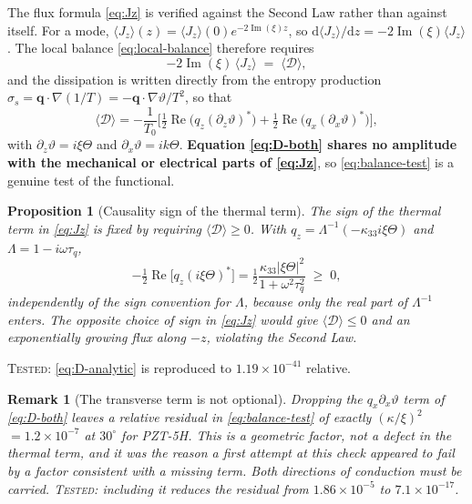 \documentclass[11pt]{article}
\newcommand{\bth}{\vartheta}
\newcommand{\bq}{\bm{q}}
\newcommand{\Lam}{\Lambda}
\theoremstyle{plain}
\newtheorem{proposition}{Proposition}
\newtheorem{remark}{Remark}
\begin{document}
The flux formula \eqref{eq:Jz} is verified against the Second Law rather than
against itself. For a mode,
$\langle J_z\rangle(z)=\langle J_z\rangle(0)e^{-2\operatorname{Im}(\xi)z}$, so
$\mathrm{d}\langle J_z\rangle/\mathrm{d}z=-2\operatorname{Im}(\xi)\langle J_z\rangle$.
The local balance \eqref{eq:local-balance} therefore requires
\begin{equation}
  -2\operatorname{Im}(\xi)\,\langle J_z\rangle
  \;=\;\langle\mathcal{D}\rangle ,
  \label{eq:balance-test}
\end{equation}
and the dissipation is written directly from the entropy production
$\sigma_s=\bq\cdot\nabla(1/T)=-\bq\cdot\nabla\bth/T^2$, so that
\begin{equation}
  \langle\mathcal{D}\rangle
  = -\frac{1}{T_0}\Big[\tfrac12\operatorname{Re}\big(q_z(\partial_z\bth)^*\big)
    +\tfrac12\operatorname{Re}\big(q_x(\partial_x\bth)^*\big)\Big],
  \label{eq:D-both}
\end{equation}
with $\partial_z\bth=i\xi\Theta$ and $\partial_x\bth=ik\Theta$. \textbf{Equation
\eqref{eq:D-both} shares no amplitude with the mechanical or electrical parts of
\eqref{eq:Jz}}, so \eqref{eq:balance-test} is a genuine test of the functional.

\begin{proposition}[Causality sign of the thermal term]
\label{prop:thermal-sign}
The sign of the thermal term in \eqref{eq:Jz} is fixed by requiring
$\langle\mathcal{D}\rangle\ge0$. With $q_z=\Lam^{-1}(-\kappa_{33}i\xi\Theta)$ and
$\Lam=1-i\omega\tau_q$,
\begin{equation}
  -\tfrac12\operatorname{Re}\big[q_z(i\xi\Theta)^*\big]
  =\tfrac12\frac{\kappa_{33}\lvert\xi\Theta\rvert^{2}}{1+\omega^2\tau_q^{2}}
  \;\ge\;0 ,
  \label{eq:D-analytic}
\end{equation}
independently of the sign convention for $\Lam$, because only the real part of
$\Lam^{-1}$ enters. The opposite choice of sign in \eqref{eq:Jz} would give
$\langle\mathcal{D}\rangle\le0$ and an exponentially \emph{growing} flux along
$-z$, violating the Second Law.
\end{proposition}
\textsc{Tested}: \eqref{eq:D-analytic} is reproduced to $1.19\times10^{-41}$
relative.

\begin{remark}[The transverse term is not optional]
\label{rem:transverse}
Dropping the $q_x\partial_x\bth$ term of \eqref{eq:D-both} leaves a relative
residual in \eqref{eq:balance-test} of exactly $(\kappa/\xi)^2$
$=1.2\times10^{-7}$ at $30^\circ$ for PZT-5H. This is a geometric factor, not a
defect in the thermal term, and it was the reason a first attempt at this check
appeared to fail by a factor consistent with a missing term. Both directions of
conduction must be carried. \textsc{Tested}: including it reduces the residual
from $1.86\times10^{-5}$ to $7.1\times10^{-17}$.
\end{remark}
\end{document}
